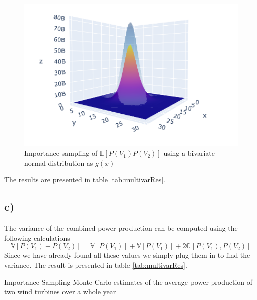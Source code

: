 \documentclass[a4paper]{article}
\begin{document}
\begin{figure}[H]
    \centering
    \includegraphics[width = 1.0\textwidth]{images/mtBruno}
    \caption{Importance sampling of $\mathbb{E}[P(V_1)P(V_2)]$ using a bivariate normal distribution as $g(x)$}
    \label{fig:mtBruno}
\end{figure}


The results are presented in table \ref{tab:multivarRes}.

\subsection*{c)}
The variance of the combined power production can be computed using the following calculations
\begin{equation}
    \mathbb{V}[P(V_1) + P(V_2)] = \mathbb{V}[P(V_1)] + \mathbb{V}[P(V_1)] + 2\mathbb{C}[P(V_1), P(V_2)]
\end{equation}
Since we have already found all these values we simply plug them in to find the variance. The result is presented in table \ref{tab:multivarRes}.

\begin{table}[H]
    \centering
    \caption{Importance Sampling Monte Carlo estimates of the average power production of two wind turbines over a whole year}
    \label{tab:multivarRes}
    
\end{table}
\end{document}
